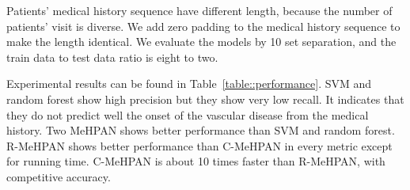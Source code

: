 \documentclass{article}
\begin{document}
Patients' medical history sequence have different length, because the number of patients' visit is diverse. We add zero padding to the medical history sequence to make the length identical. 
We evaluate the models by 10 set separation, and the train data to test data ratio is eight to two.









%    






Experimental results can be found in Table~\ref{table::performance}.
SVM and random forest show high precision but they show very low recall. It indicates that they do not predict well the onset of the vascular disease from the medical history. 
Two MeHPAN shows better performance than SVM and random forest. R-MeHPAN shows better performance than C-MeHPAN in every metric except for running time. C-MeHPAN is about 10 times faster than R-MeHPAN, with competitive accuracy.
\end{document}
